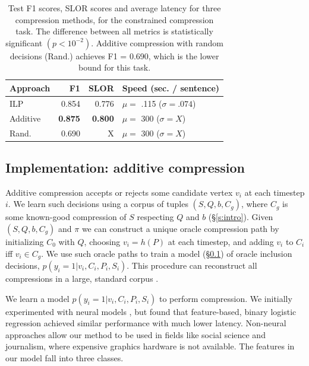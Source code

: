 \documentclass[11pt,a4paper]{article}
\begin{document}
\begin{table}[]
\begin{tabular}{lrrl}
\centering
Approach & F1 & SLOR &  Speed {\small (sec. / sentence)}  \\ \hline
ILP &  {\small 0.854}   &  {\small 0.776 }  & {\small $\mu=$ .115} ({\small $ \sigma=.074$}) \\
Additive &  {\small \textbf{0.875}}  & {\small \textbf{0.800} }& {\small $\mu=$ 300} ({\small $ \sigma=X$}) \\
Rand.  &  {\small 0.690}  & { X }& {\small $\mu=$ 300} ({\small $ \sigma=X$}) \\
\end{tabular}
\caption{Test F1 scores, SLOR scores and average latency for three compression methods, for the constrained compression task. The difference between all metrics is statistically significant {\small $(p < 10^{-2})$}. Additive compression with random decisions (Rand.) achieves F1 = 0.690, which is the lower bound for this task.}
\label{t:results}
\end{table}

\subsection{Implementation: additive compression}\label{s:transition}

Additive compression accepts or rejects some candidate vertex $v_i$ at each timestep $i$. 
We learn such decisions using a corpus of tuples $(S,Q,b,C_g)$, where $C_g$ is some known-good compression of $S$ respecting $Q$ and $b$ (\S\ref{s:intro}). Given $(S,Q,b,C_g)$ and $\pi$ we can construct a unique oracle compression path by initializing $C_0$ with $Q$, choosing $v_i = h(P)$ at each timestep, and adding $v_i$ to $C_i$ iff $v_i \in C_g$. We use such oracle paths to train a model (\S\ref{s:transition}) of oracle inclusion decisions, ${p(y_i  = 1 | v_i, C_i, P_i, S_i)}$. This procedure can reconstruct all compressions in a large, standard corpus \cite{filippova2013overcoming}. 

We learn a model $p(y_i  = 1 | v_i, C_i, P_i, S_i)$ to perform compression. We initially experimented with neural models \cite{D14-1082}, but found that feature-based, binary logistic regression achieved similar performance with much lower latency. Non-neural approaches allow our method to be used in fields like social science and journalism, where expensive graphics hardware is not available. The features in our model fall into three classes.
\end{document}
